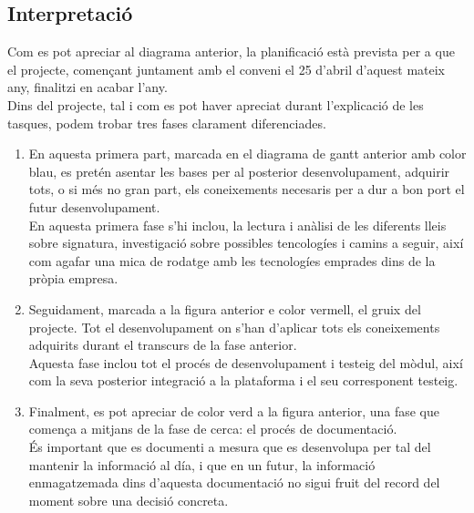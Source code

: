 \subsection{Interpretació}
Com es pot apreciar al diagrama anterior, la planificació està prevista per a que el projecte, començant juntament amb el conveni el 25 d'abril d'aquest mateix any, finalitzi en acabar l'any.\\
\newline Dins del projecte, tal i com es pot haver apreciat durant l'explicació de les tasques, podem trobar tres fases clarament diferenciades.
\renewcommand{\labelenumi}{\roman{enumi}}
\begin{enumerate}
	\item En aquesta primera part, marcada en el diagrama de gantt anterior amb color blau, es pretén asentar les bases per al posterior desenvolupament, adquirir tots, o si més no gran part,  els coneixements necesaris per a dur a bon port el futur desenvolupament.\\
		\newline En aquesta primera fase s'hi inclou, la lectura i anàlisi de les diferents lleis sobre signatura, investigació sobre possibles tencologíes i camins a seguir, així com agafar una mica de rodatge amb les tecnologíes emprades dins de la pròpia empresa.
	\item Seguidament, marcada a la figura anterior e color vermell, el gruix del projecte. Tot el desenvolupament on s'han d'aplicar tots els coneixements adquirits durant el transcurs de la fase anterior.\\
		\newline Aquesta fase inclou tot el procés de desenvolupament i testeig del mòdul, així com la seva posterior integració a la plataforma i el seu corresponent testeig.
	\item Finalment, es pot apreciar de color verd a la figura anterior, una fase que comença a mitjans de la fase de cerca: el procés de documentació.\\
		\newline És important que es documenti a mesura que es desenvolupa per tal del mantenir la informació al día, i que en un futur, la informació enmagatzemada dins d'aquesta documentació no sigui fruit del record del moment sobre una decisió concreta.
\end{enumerate}

